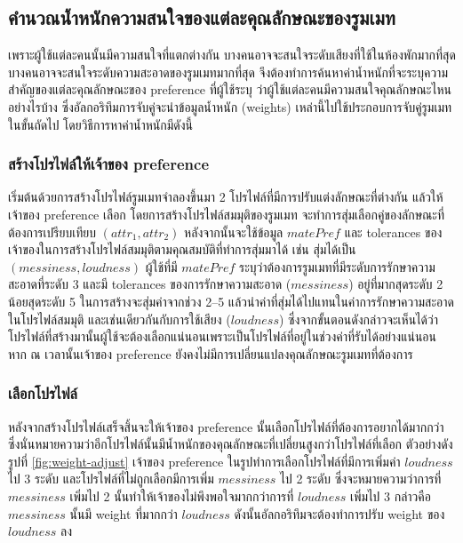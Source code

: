 \subsection{คำนวณน้ำหนักความสนใจของแต่ละคุณลักษณะของรูมเมท}
เพราะผู้ใช้แต่ละคนนั้นมีความสนใจที่แตกต่างกัน บางคนอาจจะสนใจระดับเสียงที่ใช้ในห้องพักมากที่สุด บางคนอาจจะสนใจระดับความสะอาดของรูมเมทมากที่สุด 
จึงต้องทำการค้นหาค่าน้ำหนักที่จะระบุความสำคัญของแต่ละคุณลักษณะของ preference ที่ผู้ใช้ระบุ ว่าผู้ใช้แต่ละคนมีความสนใจคุณลักษณะไหนอย่างไรบ้าง  
ซึ่งอัลกอริทึมการจับคู่จะนำข้อมูลน้ำหนัก (weights) เหล่านี้ไปใช้ประกอบการจับคู่รูมเมทในขั้นถัดไป โดยวิธีการหาค่าน้ำหนักมีดังนี้
\subsubsection{สร้างโปรไฟล์ให้เจ้าของ preference}
เริ่มต้นด้วยการสร้างโปรไฟล์รูมเมทจำลองขึ้นมา 2 โปรไฟล์ที่มีการปรับแต่งลักษณะที่ต่างกัน แล้วให้เจ้าของ preference เลือก 
โดยการสร้างโปรไฟล์สมมุติของรูมเมท จะทำการสุ่มเลือกคู่ของลักษณะที่ต้องการเปรียบเทียบ $(\mathit{attr}_1, \mathit{attr}_2)$ หลังจากนั้นจะใช้ข้อมูล 
$\mathit{matePref}$ และ tolerances ของเจ้าของในการสร้างโปรไฟล์สมมุติตามคุณสมบัติที่ทำการสุ่มมาได้ เช่น สุ่มได้เป็น $(\mathit{messiness}, \mathit{loudness})$ 
ผู้ใช้ที่มี $\mathit{matePref}$ ระบุว่าต้องการรูมเมทที่มีระดับการรักษาความสะอาดที่ระดับ 3 และมี tolerances ของการรักษาความสะอาด ($\mathit{messiness}$) อยู่ที่มากสุดระดับ 2 
น้อยสุดระดับ 5 ในการสร้างจะสุ่มค่าจากช่วง 2--5 แล้วนำค่าที่สุ่มได้ไปแทนในค่าการรักษาความสะอาดในโปรไฟล์สมมุติ และเช่นเดียวกันกับการใช้เสียง ($\mathit{loudness}$)
ซึ่งจากขั้นตอนดังกล่าวจะเห็นได้ว่าโปรไฟล์ที่สร้างมานั้นผู้ใช้จะต้องเลือกแน่นอนเพราะเป็นโปรไฟล์ที่อยู่ในช่วงค่าที่รับได้อย่างแน่นอน หาก ณ เวลานั้นเจ้าของ preference 
ยังคงไม่มีการเปลี่ยนแปลงคุณลักษณะรูมเมทที่ต้องการ

\subsubsection{เลือกโปรไฟล์}
หลังจากสร้างโปรไฟล์เสร็จสิ้นจะให้เจ้าของ preference นั้นเลือกโปรไฟล์ที่ต้องการอยากได้มากกว่า ซึ่งนั่นหมายความว่าอีกโปรไฟล์นั้นมีน้ำหนักของคุณลักษณะที่เปลี่ยนสูงกว่าโปรไฟล์ที่เลือก
ตัวอย่างดังรูปที่ \ref{fig:weight-adjust} เจ้าของ preference ในรูปทำการเลือกโปรไฟล์ที่มีการเพิ่มค่า $\mathit{loudness}$ ไป 3 ระดับ และโปรไฟล์ที่ไม่ถูกเลือกมีการเพิ่ม $\mathit{messiness}$ ไป 2 ระดับ
ซึ่งจะหมายความว่าการที่ $\mathit{messiness}$ เพิ่มไป 2 นั้นทำให้เจ้าของไม่พึงพอใจมากกว่าการที่ $\mathit{loudness}$ เพิ่มไป 3 กล่าวคือ $\mathit{messiness}$ นั้นมี weight ที่มากกว่า $\mathit{loudness}$
ดังนั้นอัลกอริทึมจะต้องทำการปรับ weight ของ $\mathit{loudness}$ ลง

